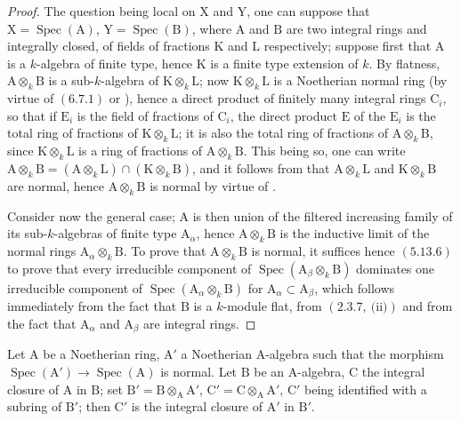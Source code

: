 \begin{proof}
The question being local on $\mathrm{X}$ and $\mathrm{Y}$, one can suppose that $\mathrm{X}=\operatorname{Spec}(\mathrm{A})$, $\mathrm{Y}=\operatorname{Spec}(\mathrm{B})$,
where $\mathrm{A}$ and $\mathrm{B}$ are two integral rings and integrally closed, of fields of fractions $\mathrm{K}$
and $\mathrm{L}$ respectively; suppose first that $\mathrm{A}$ is a $k$-algebra of finite type, hence $\mathrm{K}$
is a finite type extension of $k$. By flatness, $\mathrm{A}\otimes_k\mathrm{B}$ is a sub-$k$-algebra of $\mathrm{K}\otimes_k\mathrm{L}$;
now $\mathrm{K}\otimes_k\mathrm{L}$ is a Noetherian normal ring (by virtue of $(6.7.1)$ or ),
hence a direct product of finitely many integral rings $\mathrm{C}_i$, so that if $\mathrm{E}_i$ is the
field of fractions of $\mathrm{C}_i$, the direct product $\mathrm{E}$ of the $\mathrm{E}_i$ is the total ring of fractions
of $\mathrm{K}\otimes_k\mathrm{L}$; it is also the total ring of fractions of $\mathrm{A}\otimes_k\mathrm{B}$, since $\mathrm{K}\otimes_k\mathrm{L}$
is a ring of fractions of $\mathrm{A}\otimes_k\mathrm{B}$. This being so, one can write $\mathrm{A}\otimes_k\mathrm{B}=(\mathrm{A}\otimes_k\mathrm{L})\cap(\mathrm{K}\otimes_k\mathrm{B})$,
and it follows from  that $\mathrm{A}\otimes_k\mathrm{L}$ and $\mathrm{K}\otimes_k\mathrm{B}$ are normal, hence $\mathrm{A}\otimes_k\mathrm{B}$ is normal
by virtue of .

Consider now the general case; $\mathrm{A}$ is then union of the filtered increasing
family of its sub-$k$-algebras of finite type $\mathrm{A}_\alpha$, hence $\mathrm{A}\otimes_k\mathrm{B}$ is the inductive limit of the
normal rings $\mathrm{A}_\alpha\otimes_k\mathrm{B}$. To prove that $\mathrm{A}\otimes_k\mathrm{B}$ is normal, it suffices hence $(5.13.6)$
to prove that every irreducible component of $\operatorname{Spec}(\mathrm{A}_\beta\otimes_k\mathrm{B})$ dominates one irreducible component
of $\operatorname{Spec}(\mathrm{A}_\alpha\otimes_k\mathrm{B})$ for $\mathrm{A}_\alpha\subset\mathrm{A}_\beta$, which follows immediately from the fact that $\mathrm{B}$ is
a $k$-module flat, from $(2.3.7,~\text{(ii)})$ and from the fact that $\mathrm{A}_\alpha$ and $\mathrm{A}_\beta$ are integral rings.
\end{proof}

\begin{proposition}[6.14.4]
\label{IV.6.14.4}
Let $\mathrm{A}$ be a Noetherian ring, $\mathrm{A}'$ a Noetherian $\mathrm{A}$-algebra
such that the morphism $\operatorname{Spec}(\mathrm{A}')\to\operatorname{Spec}(\mathrm{A})$ is normal. Let $\mathrm{B}$ be an $\mathrm{A}$-algebra, $\mathrm{C}$ the integral
closure of $\mathrm{A}$ in $\mathrm{B}$; set $\mathrm{B}'=\mathrm{B}\otimes_\mathrm{A}\mathrm{A}'$, $\mathrm{C}'=\mathrm{C}\otimes_\mathrm{A}\mathrm{A}'$, $\mathrm{C}'$ being identified with a subring
of $\mathrm{B}'$; then $\mathrm{C}'$ is the integral closure of $\mathrm{A}'$ in $\mathrm{B}'$.
\end{proposition}

